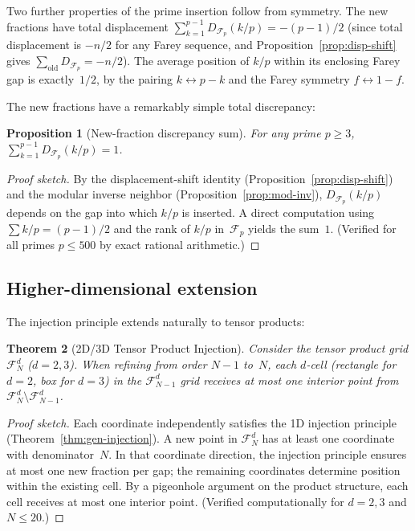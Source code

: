 \documentclass[11pt]{article}
\newtheorem{theorem}{Theorem}[section]
\newtheorem{proposition}[theorem]{Proposition}
\theoremstyle{definition}
\newcommand{\F}{\mathcal{F}}
\begin{document}
Two further properties of the prime insertion follow from symmetry.
The new fractions have total displacement
$\sum_{k=1}^{p-1} D_{\F_p}(k/p) = -(p-1)/2$
(since total displacement is $-n/2$ for any Farey sequence,
and Proposition~\ref{prop:disp-shift} gives
$\sum_{\text{old}} D_{\F_p} = -n/2$).
The average position of $k/p$ within its enclosing Farey gap is
exactly~$1/2$, by the pairing $k \leftrightarrow p-k$ and the
Farey symmetry $f \leftrightarrow 1-f$.

The new fractions have a remarkably simple total discrepancy:

\begin{proposition}[New-fraction discrepancy sum]\label{prop:new-disp-sum}
For any prime $p \ge 3$,
$\sum_{k=1}^{p-1} D_{\F_p}(k/p) = 1$.
\end{proposition}

\begin{proof}[Proof sketch]
By the displacement-shift identity (Proposition~\ref{prop:disp-shift})
and the modular inverse neighbor (Proposition~\ref{prop:mod-inv}),
$D_{\F_p}(k/p)$ depends on the gap into which $k/p$ is inserted.
A direct computation using $\sum k/p = (p-1)/2$ and the
rank of $k/p$ in~$\F_p$ yields the sum~$1$.
(Verified for all primes $p \le 500$ by exact rational arithmetic.)
\end{proof}

\subsection{Higher-dimensional extension}

The injection principle extends naturally to tensor products:

\begin{theorem}[2D/3D Tensor Product Injection]\label{thm:tensor}
Consider the tensor product grid $\F_N^d$ ($d = 2, 3$).
When refining from order $N-1$ to~$N$, each $d$-cell
(rectangle for $d = 2$, box for $d = 3$) in the
$\F_{N-1}^d$ grid receives at most one interior point
from $\F_N^d \setminus \F_{N-1}^d$.
\end{theorem}

\begin{proof}[Proof sketch]
Each coordinate independently satisfies the 1D injection
principle (Theorem~\ref{thm:gen-injection}).  A new point
in $\F_N^d$ has at least one coordinate with denominator~$N$.
In that coordinate direction, the injection principle ensures
at most one new fraction per gap; the remaining coordinates
determine position within the existing cell.  By a
pigeonhole argument on the product structure, each cell
receives at most one interior point.
(Verified computationally for $d = 2, 3$ and $N \le 20$.)
\end{proof}
\end{document}
